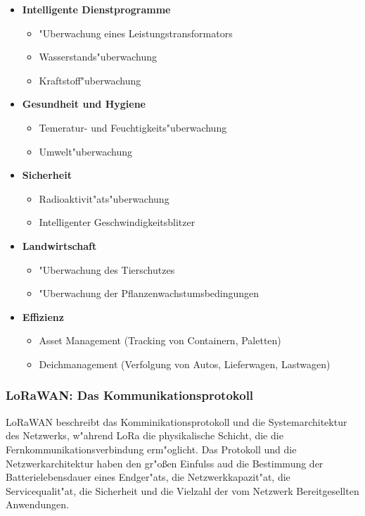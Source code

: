 \begin{itemize}
	\item \textbf{Intelligente Dienstprogramme}
	\begin{itemize}
		\item "Uberwachung eines Leistungstransformators
		\item Wasserstands"uberwachung
		\item Kraftstoff"uberwachung
	\end{itemize}

	\item \textbf{Gesundheit und Hygiene}
	\begin{itemize}
		\item Temeratur- und Feuchtigkeits"uberwachung
		\item Umwelt"uberwachung
	\end{itemize}

	\item \textbf{Sicherheit}
	\begin{itemize}
		\item Radioaktivit"ats"uberwachung
		\item Intelligenter Geschwindigkeitsblitzer
	\end{itemize}

	\item \textbf{Landwirtschaft}
	\begin{itemize}
		\item "Uberwachung des Tierschutzes
		\item "Uberwachung der Pflanzenwachstumsbedingungen
	\end{itemize}

		\item \textbf{Effizienz}
	\begin{itemize}
		\item Asset Management (Tracking von Containern, Paletten)
		\item Deichmanagement (Verfolgung von Autos, Lieferwagen, Lastwagen)
	\end{itemize}
\end{itemize}

\subsubsection{LoRaWAN: Das Kommunikationsprotokoll}\label{protokol}

LoRaWAN beschreibt das Komminikationsprotokoll und die Systemarchitektur des Netzwerks, w"ahrend LoRa die physikalische Schicht, die die Fernkommunikationsverbindung erm"oglicht. Das Protokoll und die Netzwerkarchitektur haben den gr"o\ss{}en Einfulss aud die Bestimmung der Batterielebensdauer eines Endger"ats, die Netzwerkkapazit"at, die Servicequalit"at, die Sicherheit und die Vielzahl der vom Netzwerk Bereitgesellten Anwendungen. 

